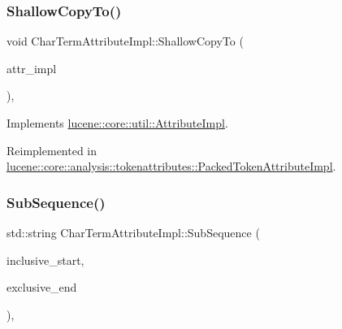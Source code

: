\subsubsection{\texorpdfstring{Shallow\+Copy\+To()}{ShallowCopyTo()}}
{\footnotesize\ttfamily void Char\+Term\+Attribute\+Impl\+::\+Shallow\+Copy\+To (\begin{DoxyParamCaption}\item[{\mbox{\hyperlink{classlucene_1_1core_1_1util_1_1AttributeImpl}{lucene\+::core\+::util\+::\+Attribute\+Impl}} \&}]{attr\+\_\+impl }\end{DoxyParamCaption})\hspace{0.3cm}{\ttfamily [override]}, {\ttfamily [virtual]}}



Implements \mbox{\hyperlink{classlucene_1_1core_1_1util_1_1AttributeImpl_a010e8937832f53139c8fe42757476895}{lucene\+::core\+::util\+::\+Attribute\+Impl}}.



Reimplemented in \mbox{\hyperlink{classlucene_1_1core_1_1analysis_1_1tokenattributes_1_1PackedTokenAttributeImpl_ab89c820321f0f5b84c7a392bb8de32f3}{lucene\+::core\+::analysis\+::tokenattributes\+::\+Packed\+Token\+Attribute\+Impl}}.

\mbox{\label{classlucene_1_1core_1_1analysis_1_1tokenattributes_1_1CharTermAttributeImpl_a286d2dd38ce24fb0da4c077e8f06bb25}} 
\subsubsection{\texorpdfstring{Sub\+Sequence()}{SubSequence()}}
{\footnotesize\ttfamily std\+::string Char\+Term\+Attribute\+Impl\+::\+Sub\+Sequence (\begin{DoxyParamCaption}\item[{\mbox{\hyperlink{ZlibCrc32_8h_a2c212835823e3c54a8ab6d95c652660e}{const}} uint32\+\_\+t}]{inclusive\+\_\+start,  }\item[{\mbox{\hyperlink{ZlibCrc32_8h_a2c212835823e3c54a8ab6d95c652660e}{const}} uint32\+\_\+t}]{exclusive\+\_\+end }\end{DoxyParamCaption})\hspace{0.3cm}{\ttfamily [override]}, {\ttfamily [virtual]}}



